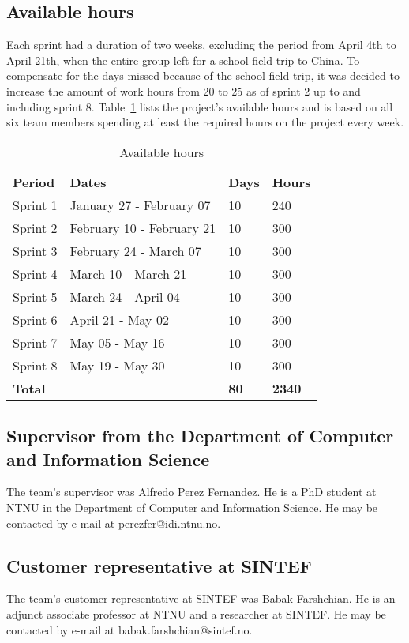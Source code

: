 \subsection{Available hours}

Each sprint had a duration of two weeks, excluding the period from April 4th to April 21th, when the entire group left for a school field trip to China. To compensate for the days missed because of the school field trip, it was decided to increase the amount of work hours from 20 to 25 as of sprint 2 up to and including sprint 8. Table~\ref{tab:availHours} lists the project's available hours and is based on all six team members spending at least the required hours on the project every week.

\begin{table}[H]
\centering
{}
\begin{tabular}{|l|l|l|l|}
\hline
\textbf{Period} & \textbf{Dates} & \textbf{Days} & \textbf{Hours}\\
Sprint 1& January 27 - February 07 & 10  & 240 \\
Sprint 2 & February 10 - February 21 &10  & 300 \\
Sprint 3 & February 24 - March 07 &10 & 300 \\
Sprint 4 & March 10 - March 21 &10  &300 \\
Sprint 5 & March 24 - April 04 &10&  300 \\
Sprint 6 & April 21 - May 02 &10  &300 \\
Sprint 7 & May 05 - May 16 &10  &300 \\
Sprint 8 & May 19 - May 30 &10  &300 \\
\textbf{Total}&& \textbf{80}&  \textbf{2340}\\\hline
\end{tabular}
\caption{Available hours}
\label{tab:availHours}
\end{table}


\subsection{Supervisor from the Department of Computer and Information Science}
The team's supervisor was Alfredo Perez Fernandez. He is a PhD student at NTNU in the Department of Computer and Information Science. He may be contacted by e-mail at perezfer@idi.ntnu.no.

\subsection{Customer representative at SINTEF}
The team's customer representative at SINTEF was Babak Farshchian. He is an adjunct associate professor at NTNU and a researcher at SINTEF. He may be contacted by e-mail at babak.farshchian@sintef.no.
